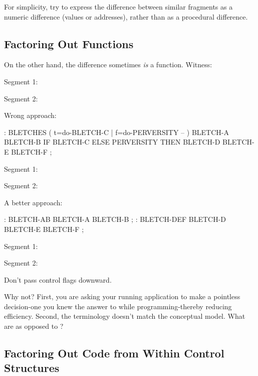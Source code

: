 \begin{tip}
For simplicity, try to express the difference between similar
fragments as a numeric difference (values or addresses), rather than
as a procedural difference.
\end{tip}

\subsection{{Factoring Out Functions}}
On the other hand, the difference sometimes \emph{is} a function. Witness:

\bigskip


Segment 1:	

Segment 2:	

\bigskip

\noindent
Wrong approach:

\begin{Code}
: BLETCHES ( t=do-BLETCH-C | f=do-PERVERSITY -- ) 
   BLETCH-A BLETCH-B IF BLETCH-C ELSE PERVERSITY 
      THEN BLETCH-D BLETCH-E BLETCH-F ;
\end{Code}

\noindent 
Segment 1:	

\noindent
Segment 2:	

\bigskip

\noindent 
A better approach:

\begin{Code}
: BLETCH-AB BLETCH-A BLETCH-B ;
: BLETCH-DEF BLETCH-D BLETCH-E BLETCH-F ;
\end{Code}

\indent Segment 1:	

\indent Segment 2:	

\begin{tip}
Don't pass control flags downward.
\end{tip}
Why not? First, you are asking your running application to make a
pointless decision-one you knew the answer to while
programming-thereby reducing efficiency. Second, the terminology
doesn't match the conceptual model. What are 
as opposed to ?

\subsection{{Factoring Out Code from Within Control Structures}}

